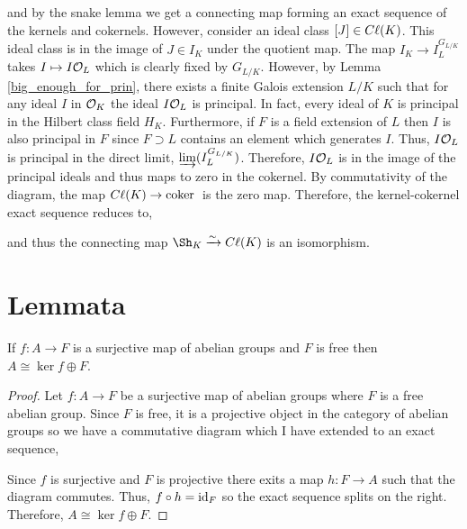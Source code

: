 \documentclass[12pt]{extarticle}
\begin{document}
and by the snake lemma we get a connecting map forming an exact sequence of the kernels and cokernels. However, consider an ideal class $[J] \in C\ell(K)$. This ideal class is in the image of $J \in I_K$ under the quotient map. The map $I_K \to I_L^{G_{L/K}}$ takes $I \mapsto I \mathcal{O}_{L}$ which is clearly fixed by $G_{L/K}$. However, by Lemma \ref{big_enough_for_prin}, there exists a finite Galois extension $L/K$ such that for any ideal $I$ in $\mathcal{O}_{K}$ the ideal $I \mathcal{O}_{L}$ is principal. In fact, every ideal of $K$ is principal in the Hilbert class field $H_K$. Furthermore, if $F$ is a field extension of $L$ then $I$ is also principal in $F$ since $F \supset L$ contains an element which generates $I$. Thus, $I \mathcal{O}_{L}$ is principal in the direct limit, $\varinjlim (I_L^{G_{L/K}})$. Therefore, $I \mathcal{O}_{L}$ is in the image of the principal ideals and thus maps to zero in the cokernel. By commutativity of the diagram, the map $\Cl{K} \to \coker$ is the zero map. Therefore, the kernel-cokernel exact sequence reduces to,
\begin{center}
\end{center} 
and thus the connecting map $\Sh_K \xrightarrow{\sim} \Cl{K}$ is an isomorphism. 

\section{Lemmata}

\begin{lemma}
If $f : A \to F$ is a surjective map of abelian groups and $F$ is free then $A \cong \ker{f} \oplus F$.
\end{lemma}

\begin{proof}
Let $f : A \to F$ be a surjective map of abelian groups where $F$ is a free abelian group. Since $F$ is free, it is a projective object in the category of abelian groups so we have a commutative diagram which I have extended to an exact sequence,
\begin{center}
\end{center}
Since $f$ is surjective and $F$ is projective there exits a map $h : F \to A$ such that the diagram commutes. Thus, $f \circ h = \mathrm{id}_F$ so the exact sequence splits on the right. Therefore, $A \cong \ker{f} \oplus F$. 
\end{proof}
\end{document}
